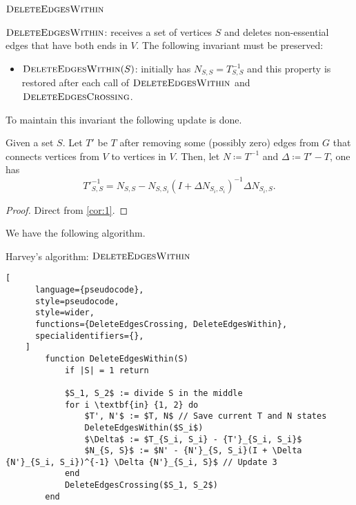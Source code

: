 \subsection{\(\textsc{DeleteEdgesWithin}\)}

\(\textsc{DeleteEdgesWithin}\): receives a set of vertices \(S\) and deletes non-essential edges that have both ends in \(V\).
The following invariant must be preserved:
\begin{itemize}
    \item \(\textsc{DeleteEdgesWithin}(S)\): initially has \(N_{S, S} = T^{-1}_{S, S}\) and this property is restored after each call of \(\textsc{DeleteEdgesWithin}\)
    and \(\textsc{DeleteEdgesCrossing}\).
\end{itemize}
To maintain this invariant the following update is done.
\begin{theorem}[Update 3]
    Given a set \(S\). Let \(T'\) be \(T\) after removing some (possibly zero) edges from \(G\) that connects vertices from \(V\) to vertices in \(V\).
    Then, let \(N \coloneqq T^{-1}\) and \(\Delta \coloneqq T' - T\), one has
    \[
        {T'}^{-1}_{S, S} = N_{S, S} - N_{S, S_i}(I + \Delta N_{S_i, S_i})^{-1} \Delta N_{S_i, S}.
    \]
\end{theorem}

\begin{proof}
    Direct from \ref{cor:1}.
\end{proof}

We have the following algorithm.

\begin{programruledcaption}{Harvey's algorithm: \(\textsc{DeleteEdgesWithin}\)}
    \begin{lstlisting}[
      language={pseudocode},
      style=pseudocode,
      style=wider,
      functions={DeleteEdgesCrossing, DeleteEdgesWithin},
      specialidentifiers={},
    ]
        function DeleteEdgesWithin(S)
            if |S| = 1 return

            $S_1, S_2$ := divide S in the middle
            for i \textbf{in} {1, 2} do
                $T', N'$ := $T, N$ // Save current T and N states
                DeleteEdgesWithin($S_i$)
                $\Delta$ := $T_{S_i, S_i} - {T'}_{S_i, S_i}$
                $N_{S, S}$ := $N' - {N'}_{S, S_i}(I + \Delta {N'}_{S_i, S_i})^{-1} \Delta {N'}_{S_i, S}$ // Update 3
            end
            DeleteEdgesCrossing($S_1, S_2$)
        end
    \end{lstlisting}
\end{programruledcaption}

